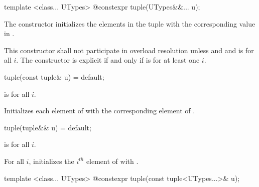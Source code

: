 %
\begin{itemdecl}
template <class... UTypes>
  @\EXPLICIT@ constexpr tuple(UTypes&&... u);
\end{itemdecl}

\begin{itemdescr}
\pnum
\effects The constructor initializes the elements in the tuple with the
corresponding value in .

\pnum
\remarks This constructor shall not participate in overload resolution unless
 \tcode{==}  and
 and 
is  for all $i$. The constructor is explicit if and only if
 is 
for at least one $i$.
\end{itemdescr}

%
\begin{itemdecl}
tuple(const tuple& u) = default;
\end{itemdecl}

\begin{itemdescr}
\pnum
\requires {} is  for all $i$.

\pnum
\effects Initializes each element of  with the
corresponding element of .
\end{itemdescr}

%
\begin{itemdecl}
tuple(tuple&& u) = default;
\end{itemdecl}

\begin{itemdescr}
\pnum
\requires {} is  for all $i$.

\pnum
\effects For all $i$, initializes the $i^{th}$ element of  with
.
\end{itemdescr}

%
\begin{itemdecl}
template <class... UTypes> @\EXPLICIT@ constexpr tuple(const tuple<UTypes...>& u);
\end{itemdecl}

